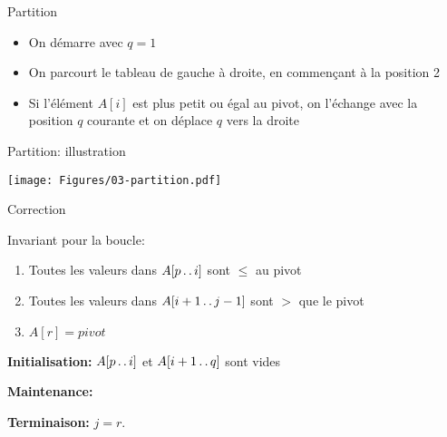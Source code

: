 \begin{frame}{Partition}

\begin{itemize}
\item On démarre avec $q=1$
\item On parcourt le tableau de gauche à droite, en commençant à la position 2
\item Si l'élément $A[i]$ est plus petit ou égal au pivot, on l'échange avec la position $q$ courante et on déplace $q$ vers la droite
\end{itemize}

\begin{center}
\end{center}

\end{frame}

\begin{frame}{Partition: illustration}

\centerline{\texttt{[image: Figures/03-partition.pdf]}}

\end{frame}

\begin{frame}{Correction}

Invariant pour la boucle:
\begin{enumerate}
\item Toutes les valeurs dans $A[p\mathinner{\ldotp\ldotp} i]$ sont $\leq$ au pivot
\item Toutes les valeurs dans $A[i+1\mathinner{\ldotp\ldotp} j-1]$ sont $>$ que le pivot
\item $A[r]=pivot$
\end{enumerate}

\bigskip


{\bf Initialisation:} $A[p\mathinner{\ldotp\ldotp} i]$ et $A[i+1\mathinner{\ldotp\ldotp} q]$ sont vides

{\bf Maintenance:} 

{\bf Terminaison:} $j=r$.


\end{frame}

